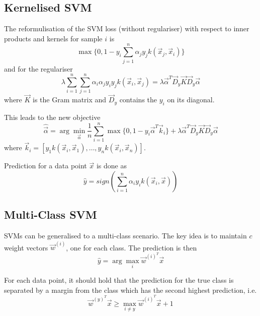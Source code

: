 \subsection{Kernelised SVM}
The reformulisation of the SVM loss (without regulariser)
with respect to inner products and kernels
for sample $i$ is
\begin{equation*}
    \max\{0, 1 - y_i \sum_{j=1}^n{\alpha_j y_j k(\vec{x}_j, \vec{x}_i)}\}
\end{equation*}
and for the regulariser
\begin{equation*}
    \lambda \sum_{i=1}^n\sum_{j=1}^n{
        \alpha_i \alpha_j y_i y_j k(\vec{x}_i, \vec{x}_j)
    }
    = \lambda \vec{\alpha}^T \vec{D}_y \vec{K} \vec{D}_y \vec{\alpha}
\end{equation*}
where $\vec{K}$ is the Gram matrix and
$\vec{D}_y$ contains the $y_i$ on its diagonal.

This leads to the new objective
\begin{equation*}
    \hat{\vec{\alpha}} = \arg\min_{\vec{\alpha}}{
        \frac{1}{n} \sum_{i=1}^n{
            \max\{0, 1 - y_i \vec{\alpha}^T \vec{k}_i\} +
            \lambda \vec{\alpha}^T \vec{D}_y \vec{K} \vec{D}_y \vec{\alpha}
        }
    }
\end{equation*}
where $\vec{k}_i = [y_1 k(\vec{x}_i, \vec{x}_1), \dotsc, y_n k(\vec{x}_i, \vec{x}_n)]$.

Prediction for a data point $\vec{x}$ is done as
\begin{equation*}
    \hat{y} = sign\left(
        \sum_{i=1}^n{\alpha_i y_i k(\vec{x}_i, \vec{x})}
    \right)
\end{equation*}


\subsection{Multi-Class SVM}
SVMs can be generalised to a multi-class scenario.
The key idea is to maintain $c$ weight vectors
$\vec{w}^{(i)}$, one for each class.
The prediction is then
\begin{equation*}
    \hat{y} = \arg\max_i{\vec{w}^{(i)^T} \vec{x}}
\end{equation*}

For each data point, it should hold that the prediction
for the true class is separated by a margin from the
class which has the second highest prediction, i.e.
\begin{equation*}
    \vec{w}^{(y)^T} \vec{x} \geq
    \max_{i \neq y}{\vec{w}^{(i)^T}\vec{x}} + 1
\end{equation*}


